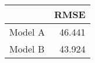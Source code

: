 
\begin{tabular}{l|r}
\hline
  & RMSE\\
\hline
Model A & 46.441\\
\hline
Model B & 43.924\\
\hline
\end{tabular}